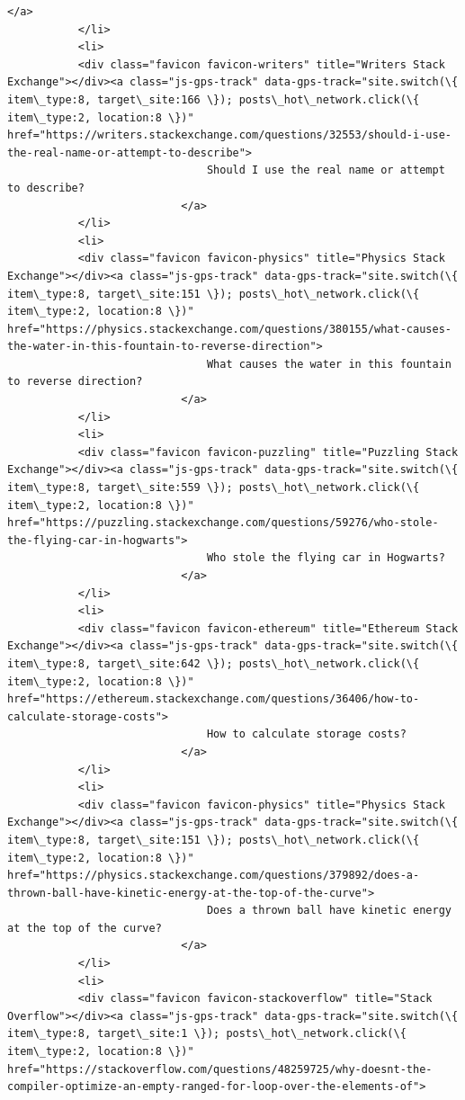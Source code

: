 \documentclass[11pt]{article}
\begin{document}
\begin{Verbatim}[commandchars=\\\{\}]
                           </a>
           </li>
           <li>
           <div class="favicon favicon-writers" title="Writers Stack Exchange"></div><a class="js-gps-track" data-gps-track="site.switch(\{ item\_type:8, target\_site:166 \}); posts\_hot\_network.click(\{ item\_type:2, location:8 \})" href="https://writers.stackexchange.com/questions/32553/should-i-use-the-real-name-or-attempt-to-describe">
                               Should I use the real name or attempt to describe?
                           </a>
           </li>
           <li>
           <div class="favicon favicon-physics" title="Physics Stack Exchange"></div><a class="js-gps-track" data-gps-track="site.switch(\{ item\_type:8, target\_site:151 \}); posts\_hot\_network.click(\{ item\_type:2, location:8 \})" href="https://physics.stackexchange.com/questions/380155/what-causes-the-water-in-this-fountain-to-reverse-direction">
                               What causes the water in this fountain to reverse direction?
                           </a>
           </li>
           <li>
           <div class="favicon favicon-puzzling" title="Puzzling Stack Exchange"></div><a class="js-gps-track" data-gps-track="site.switch(\{ item\_type:8, target\_site:559 \}); posts\_hot\_network.click(\{ item\_type:2, location:8 \})" href="https://puzzling.stackexchange.com/questions/59276/who-stole-the-flying-car-in-hogwarts">
                               Who stole the flying car in Hogwarts?
                           </a>
           </li>
           <li>
           <div class="favicon favicon-ethereum" title="Ethereum Stack Exchange"></div><a class="js-gps-track" data-gps-track="site.switch(\{ item\_type:8, target\_site:642 \}); posts\_hot\_network.click(\{ item\_type:2, location:8 \})" href="https://ethereum.stackexchange.com/questions/36406/how-to-calculate-storage-costs">
                               How to calculate storage costs?
                           </a>
           </li>
           <li>
           <div class="favicon favicon-physics" title="Physics Stack Exchange"></div><a class="js-gps-track" data-gps-track="site.switch(\{ item\_type:8, target\_site:151 \}); posts\_hot\_network.click(\{ item\_type:2, location:8 \})" href="https://physics.stackexchange.com/questions/379892/does-a-thrown-ball-have-kinetic-energy-at-the-top-of-the-curve">
                               Does a thrown ball have kinetic energy at the top of the curve?
                           </a>
           </li>
           <li>
           <div class="favicon favicon-stackoverflow" title="Stack Overflow"></div><a class="js-gps-track" data-gps-track="site.switch(\{ item\_type:8, target\_site:1 \}); posts\_hot\_network.click(\{ item\_type:2, location:8 \})" href="https://stackoverflow.com/questions/48259725/why-doesnt-the-compiler-optimize-an-empty-ranged-for-loop-over-the-elements-of">

\end{Verbatim}
\end{document}
